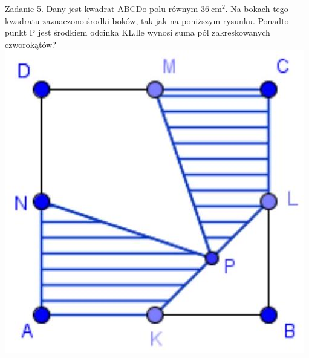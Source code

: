 \documentclass[10pt]{article}
\begin{document}
Zadanie 5. Dany jest kwadrat ABCDo polu równym \(36 \mathrm{~cm}^{2}\). Na bokach tego kwadratu zaznaczono środki boków, tak jak na poniższym rysunku. Ponadto punkt P jest środkiem odcinka KL.lle wynosi suma pól zakreskowanych czworokątów?\\
\includegraphics[max width=\textwidth, center]{2024_11_21_0222b9f9dea886a5ae2eg-1(1)}
\end{document}
